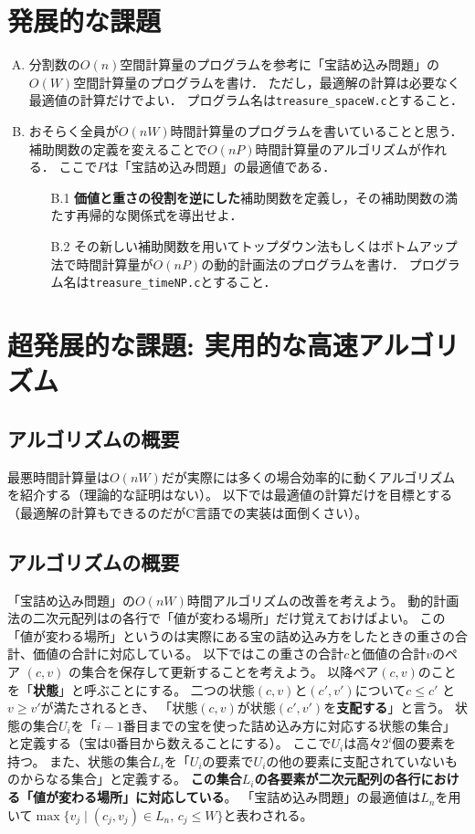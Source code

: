 \documentclass[a4paper,twoside,onecolumn,openany,article]{memoir}
\theoremstyle{remark}
\begin{document}
\section{発展的な課題}
\begin{enumerate}[A.]
\item 分割数の$O(n)$空間計算量のプログラムを参考に「宝詰め込み問題」の$O(W)$空間計算量のプログラムを書け．
ただし，最適解の計算は必要なく最適値の計算だけでよい．
プログラム名は\texttt{treasure\_spaceW.c}とすること．
\item おそらく全員が$O(nW)$時間計算量のプログラムを書いていることと思う．
補助関数の定義を変えることで$O(nP)$時間計算量のアルゴリズムが作れる．
ここで$P$は「宝詰め込み問題」の最適値である．
\begin{enumerate}
\item[B.1] \textbf{価値と重さの役割を逆にした}補助関数を定義し，その補助関数の満たす再帰的な関係式を導出せよ．
\item[B.2] その新しい補助関数を用いてトップダウン法もしくはボトムアップ法で時間計算量が$O(nP)$の動的計画法のプログラムを書け．
プログラム名は\texttt{treasure\_timeNP.c}とすること．
\end{enumerate}
\end{enumerate}

\section{超発展的な課題: 実用的な高速アルゴリズム}
\subsection{アルゴリズムの概要}
最悪時間計算量は$O(nW)$だが実際には多くの場合効率的に動くアルゴリズムを紹介する（理論的な証明はない）。
以下では最適値の計算だけを目標とする（最適解の計算もできるのだがC言語での実装は面倒くさい）。

\subsection{アルゴリズムの概要}
「宝詰め込み問題」の$O(nW)$時間アルゴリズムの改善を考えよう。
動的計画法の二次元配列はの各行で「値が変わる場所」だけ覚えておけばよい。
この「値が変わる場所」というのは実際にある宝の詰め込み方をしたときの重さの合計、価値の合計に対応している。
以下ではこの重さの合計$c$と価値の合計$v$のペア $(c, v)$ の集合を保存して更新することを考えよう。
以降ペア$(c,v)$のことを「\textbf{状態}」と呼ぶことにする。
二つの状態$(c, v)$と$(c',v')$について$c\le c'$ と $v\ge v'$が満たされるとき、
「状態$(c,v)$が状態$(c',v')$を\textbf{支配する}」と言う。
状態の集合$U_i$を「$i-1$番目までの宝を使った詰め込み方に対応する状態の集合」と定義する（宝は0番目から数えることにする）。
ここで$U_i$は高々$2^{i}$個の要素を持つ。
また、状態の集合$L_i$を「$U_i$の要素で$U_i$の他の要素に支配されていないものからなる集合」と定義する。
\textbf{この集合$L_i$の各要素が二次元配列の各行における「値が変わる場所」に対応している}。
「宝詰め込み問題」の最適値は$L_n$を用いて$\max \{ v_j\mid (c_j,v_j)\in L_n,\, c_j\le W\}$と表わされる。
\end{document}
